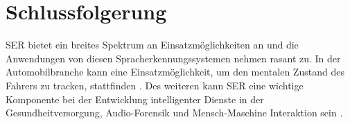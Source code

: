 \chapter{Schlussfolgerung}

SER bietet ein breites Spektrum an Einsatzmöglichkeiten an und die Anwendungen von diesen Spracherkennungssystemen nehmen rasant zu. In der Automobilbranche kann eine Einsatzmöglichkeit, um den mentalen Zustand des Fahrers zu tracken, stattfinden \cite{badshah2019deep}. Des weiteren kann SER eine wichtige Komponente bei der Entwicklung intelligenter Dienste in der Gesundheitversorgung, Audio-Forensik und Mensch-Maschine Interaktion sein \cite{badshah2019deep}.
